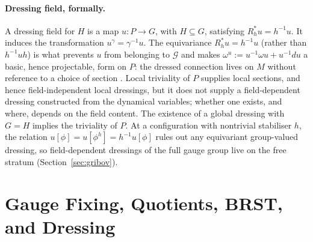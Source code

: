 \documentclass[11pt]{article}
\theoremstyle{plain}
\theoremstyle{definition}
\theoremstyle{remark}
\newcommand{\G}{\mathcal G}
\begin{document}
\paragraph{Dressing field, formally.} A dressing field for $H$ is a map $u:P\to G$, with $H\subseteq G$, satisfying $R_h^*u=h^{-1}u$. It induces the transformation $u^\gamma=\gamma^{-1}u$. The equivariance $R_h^*u=h^{-1}u$ (rather than $h^{-1}uh$) is what prevents $u$ from belonging to $\G$ and makes $\omega^u:=u^{-1}\omega u+u^{-1}du$ a basic, hence projectable, form on $P$: the dressed connection lives on $M$ without reference to a choice of section \cite{ffl2014,ravera-notes}. Local triviality of $P$ supplies local sections, and hence field-independent local dressings, but it does not supply a field-dependent dressing constructed from the dynamical variables; whether one exists, and where, depends on the field content. The existence of a global dressing with $G=H$ implies the triviality of $P$. At a configuration with nontrivial stabiliser $h$, the relation $u[\phi]=u[\phi^h]=h^{-1}u[\phi]$ rules out any equivariant group-valued dressing, so field-dependent dressings of the full gauge group live on the free stratum (Section~\ref{sec:gribov}).

\section{Gauge Fixing, Quotients, BRST, and Dressing}\label{app:compare}
\end{document}
